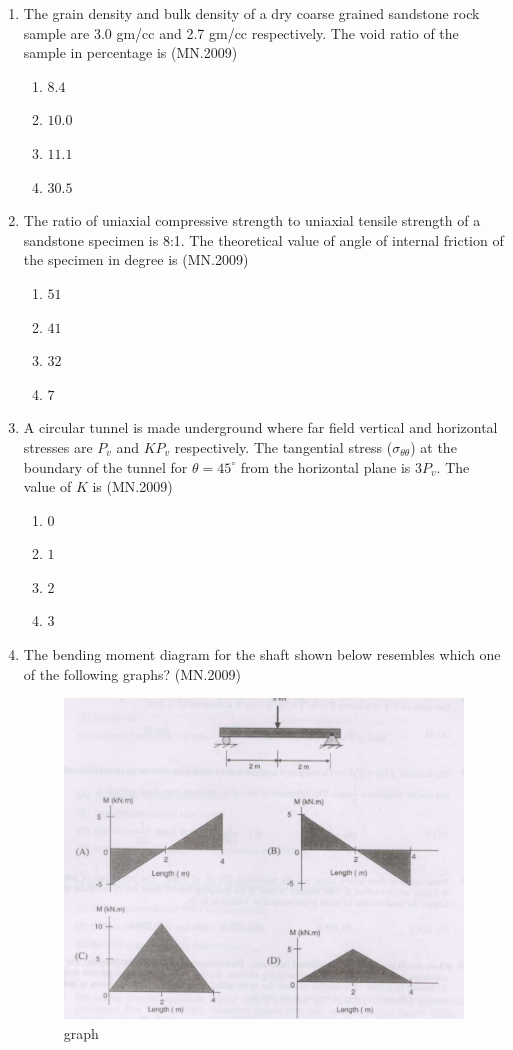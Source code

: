 \documentclass[journal]{IEEEtran}
\numberwithin{equation}{enumi}
\numberwithin{figure}{enumi}
\begin{document}
\begin{enumerate}
    \item The grain density and bulk density of a dry coarse grained sandstone rock sample are 3.0 gm/cc and 2.7 gm/cc respectively. The void ratio of the sample in percentage is
    \hfill{(MN.2009)}
    \begin{enumerate}[label=(\Alph*)]
        \item $8.4$
        \item $10.0$
        \item $11.1$
        \item $30.5$
    \end{enumerate}

    \item The ratio of uniaxial compressive strength to uniaxial tensile strength of a sandstone specimen is 8:1. The theoretical value of angle of internal friction of the specimen in degree is
    \hfill{(MN.2009)}
    \begin{enumerate}[label=(\Alph*)]
        \item $51$
        \item $41$
        \item $32$
        \item $7$
    \end{enumerate}

    \item A circular tunnel is made underground where far field vertical and horizontal stresses are $P_v$ and $KP_v$ respectively. The tangential stress ($\sigma_{\theta\theta}$) at the boundary of the tunnel for $\theta = 45^\circ$ from the horizontal plane is $3P_v$. The value of $K$ is
    \hfill{(MN.2009)}
    \begin{enumerate}[label=(\Alph*)]
        \item $0$
        \item $1$
        \item $2$
        \item $3$
    \end{enumerate}
    
\item The bending moment diagram for the shaft shown below resembles which one of the following graphs?
\hfill{(MN.2009)}
\begin{figure}[H]
    \centering
    \includegraphics[width=0.5\linewidth]{figs/fig 3.png}
    \caption{graph}
    \label{fig:placeholder}
\end{figure}


\end{enumerate}
\end{document}
